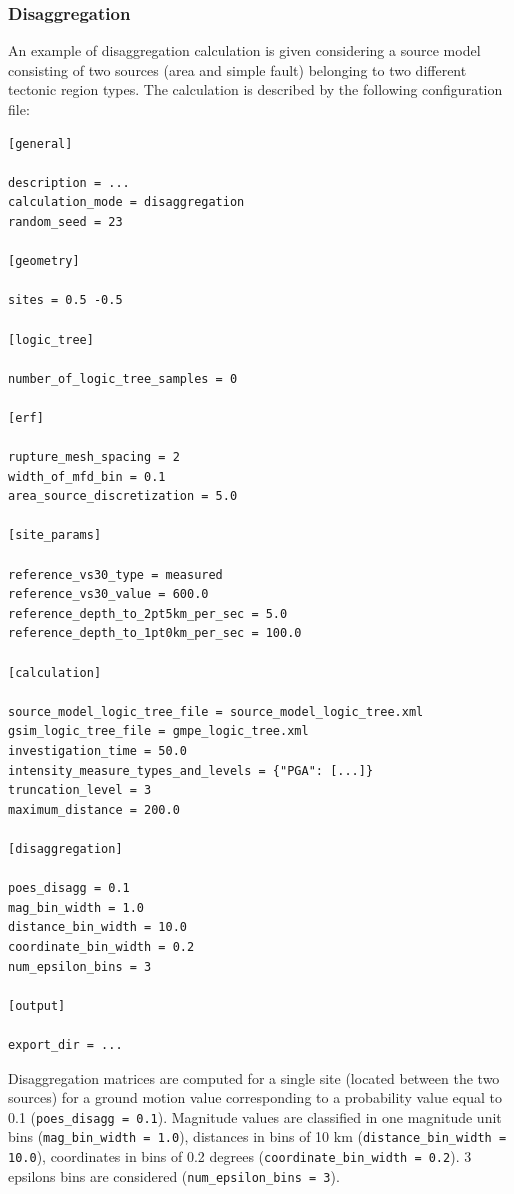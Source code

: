\subsubsection{Disaggregation}
An example of disaggregation calculation is given considering a source model consisting of two sources (area and simple fault) belonging to two different tectonic region types.
The calculation is described by the following configuration file:
\begin{Verbatim}[frame=single, commandchars=\\\{\}, fontsize=\normalsize]
[general]

description = ...
calculation_mode = disaggregation
random_seed = 23

[geometry]

sites = 0.5 -0.5

[logic_tree]

number_of_logic_tree_samples = 0

[erf]

rupture_mesh_spacing = 2
width_of_mfd_bin = 0.1
area_source_discretization = 5.0

[site_params]

reference_vs30_type = measured
reference_vs30_value = 600.0
reference_depth_to_2pt5km_per_sec = 5.0
reference_depth_to_1pt0km_per_sec = 100.0

[calculation]

source_model_logic_tree_file = source_model_logic_tree.xml
gsim_logic_tree_file = gmpe_logic_tree.xml
investigation_time = 50.0
intensity_measure_types_and_levels = {"PGA": [...]}
truncation_level = 3
maximum_distance = 200.0

[disaggregation]

poes_disagg = 0.1
mag_bin_width = 1.0
distance_bin_width = 10.0
coordinate_bin_width = 0.2
num_epsilon_bins = 3

[output]

export_dir = ...
\end{Verbatim}
Disaggregation matrices are computed for a single site (located between the two sources) for a ground motion value corresponding to a probability value equal to 0.1
(\texttt{poes\_\-disagg = 0.1}). Magnitude values are classified in one magnitude unit bins (\texttt{mag\_\-bin\_\-width = 1.0}), distances in bins of 10 km
(\texttt{distance\_\-bin\_\-width = 10.0}), coordinates in bins of 0.2 degrees (\texttt{coordinate\_\-bin\_\-width = 0.2}). 3 epsilons bins are considered (\texttt{num\_\-epsilon\_\-bins = 3}).

